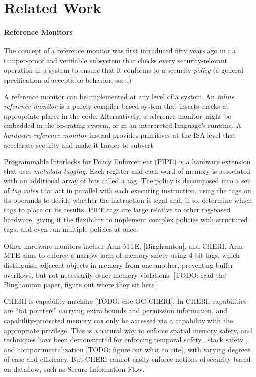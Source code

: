 \documentclass{llncs}
\begin{document}
\section{Related Work}

\paragraph{Reference Monitors}

The concept of a reference monitor was first introduced fifty years ago in \cite{Anderson72:PlanningStudy}:
a tamper-proof and verifiable subsystem that checks every security-relevant operation in a system to
ensure that it conforms to a security {\em policy} (a general specification of acceptable behavior;
see \cite{Goguen82:SecurityPolicies}.)

A reference monitor can be implemented at any level of a system. An {\em inline reference monitor}
is a purely compiler-based system that inserts checks at appropriate places in the code.
Alternatively, a reference monitor might be embedded in the operating system, or in an interpreted
language's runtime. A {\em hardware reference monitor} instead provides primitives at the ISA-level
that accelerate security and make it harder to subvert.

Programmable Interlocks for Policy Enforcement (PIPE) \cite{Dhawan14:PUMP} is a hardware extension
that uses {\em metadata tagging}. Each register and each word of memory is associated with
an additional array of bits called a tag. The policy is decomposed into a set of {\em tag rules}
that act in parallel with each executing instruction, using the tags on its operands to
decide whether the instruction is legal and, if so, determine which tags to place on its results.
PIPE tags are large relative to other tag-based hardware, giving it the flexibility
to implement complex policies with structured tags, and even run multiple policies at once.

Other hardware monitors include Arm MTE, [Binghamton], and CHERI.
Arm MTE aims to enforce a narrow form of memory safety using 4-bit tags, which distinguish adjacent objects
in memory from one another, preventing buffer overflows, but not necessarily other memory violations.
[TODO: read the Binghamton paper, figure out where they sit here.] 

CHERI is capability machine [TODO: cite OG CHERI]. In CHERI, capabilities
are ``fat pointers'' carrying extra bounds and permission information, and capability-protected
memory can only be accessed via a capability with the appropriate privilege. This is a natural
way to enforce spatial memory safety, and techniques have been demonstrated for enforcing
temporal safety \cite{NWF20:Cornucopia}, stack safety \cite{Skorstengaard19:stktokens},
and compartmentalization [TODO: figure out what to cite], with varying degrees of ease and
efficiency. But CHERI cannot easily enforce notions of security based on dataflow,
such as Secure Information Flow.
\end{document}
